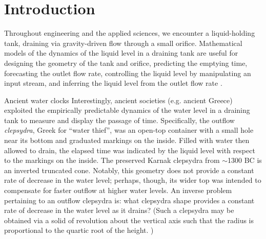 \documentclass[openacc]{rsproca_new}%
\begin{document}
\rsbreak


\section{Introduction}
Throughout engineering and the applied sciences, we encounter a liquid-holding tank, draining via gravity-driven flow through a small orifice.
Mathematical models of the dynamics of the liquid level in a draining tank are useful for designing the geometry of the tank and orifice, predicting the emptying time, forecasting the outlet flow rate, controlling the liquid level by manipulating an input stream, and inferring the liquid level from the outlet flow rate \cite{d2021torricelli,seborg2016process,groetsch1993inverse,groetsch1999inverse}.

\begin{mytcbox}[label=box:waterclocks, breakable]{Ancient water clocks}
Interestingly, ancient societies (e.g. ancient Greece) exploited the empirically predictable dynamics of the water level in a draining tank to measure and display the passage of time.
Specifically, the outflow \emph{clepsydra}, Greek for ``water thief'', was an open-top container with a small hole near its bottom and graduated markings on the inside. 
Filled with water then allowed to drain, the elapsed time was indicated by the liquid level with respect to the markings on the inside. \cite{bedini1962compartmented,hwang2021historical,ritner2016oriental,hejun1987research,schomberg2018karnak,mills1982newton}
The preserved Karnak clepsydra from $\sim$1300 BC \cite{schomberg2018karnak} is an inverted truncated cone. Notably, this geometry does not provide a constant rate of decrease in the water level; perhaps, though, its wider top was intended to compensate for faster outflow at higher water levels. An inverse problem pertaining to an outflow clepsydra is: what clepsydra shape provides a constant rate of decrease in the water level as it drains?
(Such a clepsydra may be obtained via a solid of revolution about the vertical axis such that the radius is proportional to the quartic root of the height. \cite{mills1982newton,d2021torricelli})
\end{mytcbox}
\end{document}
